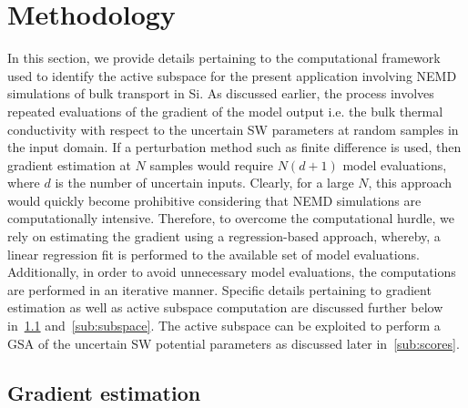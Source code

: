 \section{Methodology}
\label{sec:method}

In this section, we provide details pertaining to the computational framework used to identify
the active subspace for the present application involving NEMD simulations of bulk transport
in Si. As discussed earlier, the process involves repeated evaluations of the gradient of the model output
i.e. the bulk thermal conductivity with respect to the uncertain SW parameters at random samples
in the input domain. If a perturbation method such as finite difference is used, then gradient
estimation at $N$ samples would require $N(d+1)$ model evaluations, where $d$ is the number
of uncertain inputs. Clearly, for a large $N$, this approach would quickly become prohibitive
considering that NEMD simulations are computationally intensive. Therefore, to overcome the
computational hurdle, we rely on estimating the gradient using a regression-based approach,
whereby, a linear regression fit is performed to the available set of model evaluations. Additionally, in order
to avoid unnecessary model evaluations, the computations are performed
in an iterative manner. Specific details pertaining to gradient estimation as well as active
subspace computation are discussed further below in~\ref{sub:gradient} and~\ref{sub:subspace}. The
active subspace can be exploited to perform a GSA of the uncertain SW potential parameters as discussed
later in~\ref{sub:scores}.

\subsection{Gradient estimation}
\label{sub:gradient} 

